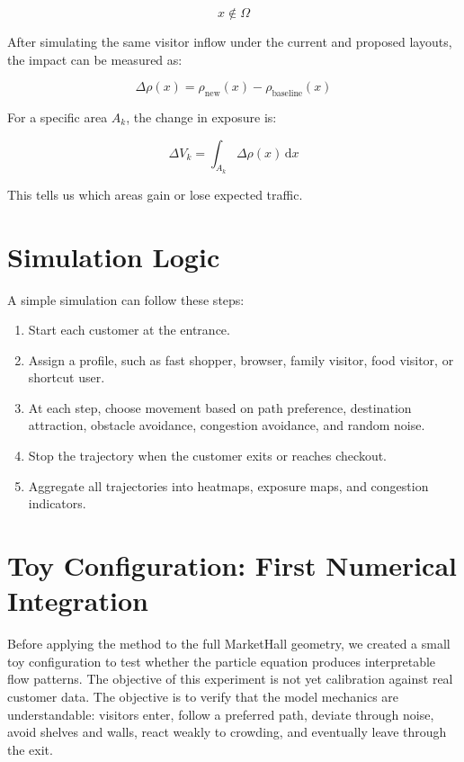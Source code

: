 \documentclass[11pt,a4paper]{article}
\begin{document}
\begin{equation}
x \notin \Omega
\end{equation}

After simulating the same visitor inflow under the current and proposed layouts, the impact can be measured as:

\begin{equation}
\Delta \rho(x) = \rho_{\text{new}}(x) - \rho_{\text{baseline}}(x)
\end{equation}

For a specific area $A_k$, the change in exposure is:

\begin{equation}
\Delta V_k = \int_{A_k} \Delta \rho(x)\,\mathrm{d}x
\end{equation}

This tells us which areas gain or lose expected traffic.

\section{Simulation Logic}

A simple simulation can follow these steps:

\begin{enumerate}[leftmargin=*]
    \item Start each customer at the entrance.
    \item Assign a profile, such as fast shopper, browser, family visitor, food visitor, or shortcut user.
    \item At each step, choose movement based on path preference, destination attraction, obstacle avoidance, congestion avoidance, and random noise.
    \item Stop the trajectory when the customer exits or reaches checkout.
    \item Aggregate all trajectories into heatmaps, exposure maps, and congestion indicators.
\end{enumerate}

\section{Toy Configuration: First Numerical Integration}

Before applying the method to the full MarketHall geometry, we created a small toy configuration to test whether the particle equation produces interpretable flow patterns. The objective of this experiment is not yet calibration against real customer data. The objective is to verify that the model mechanics are understandable: visitors enter, follow a preferred path, deviate through noise, avoid shelves and walls, react weakly to crowding, and eventually leave through the exit.
\end{document}
